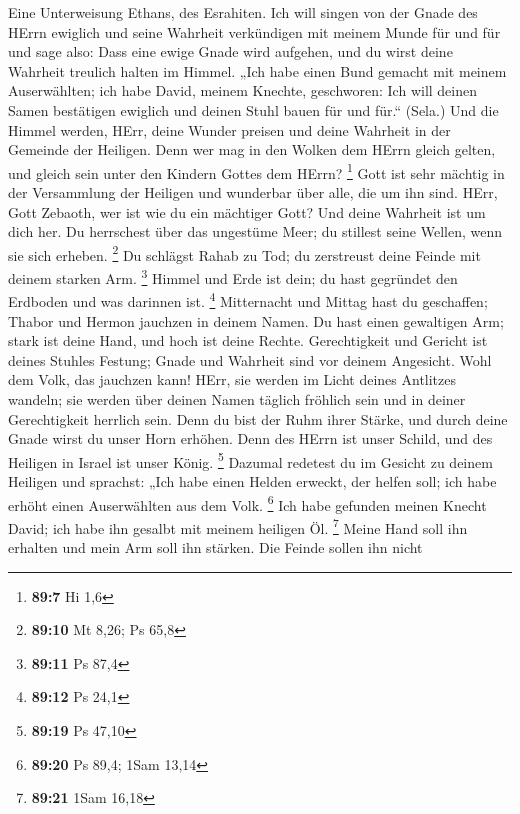  Eine Unterweisung Ethans, des Esrahiten. 
Ich will singen von der Gnade des HErrn ewiglich und seine Wahrheit
verkündigen mit meinem Munde für und für  und sage also:
Dass eine ewige Gnade wird aufgehen, und du wirst deine Wahrheit
treulich halten im Himmel.  „Ich habe einen Bund gemacht
mit meinem Auserwählten; ich habe David, meinem Knechte, geschworen:
 Ich will deinen Samen bestätigen ewiglich und deinen
Stuhl bauen für und für.`` (Sela.)  Und die Himmel werden,
HErr, deine Wunder preisen und deine Wahrheit in der Gemeinde der
Heiligen.  Denn wer mag in den Wolken dem HErrn gleich
gelten, und gleich sein unter den Kindern Gottes dem HErrn? \footnote{\textbf{89:7}
  Hi 1,6}  Gott ist sehr mächtig in der Versammlung der
Heiligen und wunderbar über alle, die um ihn sind.  HErr,
Gott Zebaoth, wer ist wie du ein mächtiger Gott? Und deine Wahrheit ist
um dich her.  Du herrschest über das ungestüme Meer; du
stillest seine Wellen, wenn sie sich erheben. \footnote{\textbf{89:10}
  Mt 8,26; Ps 65,8}  Du schlägst Rahab zu Tod; du
zerstreust deine Feinde mit deinem starken Arm. \footnote{\textbf{89:11}
  Ps 87,4}  Himmel und Erde ist dein; du hast gegründet
den Erdboden und was darinnen ist. \footnote{\textbf{89:12} Ps 24,1}
 Mitternacht und Mittag hast du geschaffen; Thabor und
Hermon jauchzen in deinem Namen.  Du hast einen
gewaltigen Arm; stark ist deine Hand, und hoch ist deine Rechte.
 Gerechtigkeit und Gericht ist deines Stuhles Festung;
Gnade und Wahrheit sind vor deinem Angesicht.  Wohl dem
Volk, das jauchzen kann! HErr, sie werden im Licht deines Antlitzes
wandeln;  sie werden über deinen Namen täglich fröhlich
sein und in deiner Gerechtigkeit herrlich sein.  Denn du
bist der Ruhm ihrer Stärke, und durch deine Gnade wirst du unser Horn
erhöhen.  Denn des HErrn ist unser Schild, und des
Heiligen in Israel ist unser König. \footnote{\textbf{89:19} Ps 47,10}
 Dazumal redetest du im Gesicht zu deinem Heiligen und
sprachst: „Ich habe einen Helden erweckt, der helfen soll; ich habe
erhöht einen Auserwählten aus dem Volk. \footnote{\textbf{89:20} Ps
  89,4; 1Sam 13,14}  Ich habe gefunden meinen Knecht
David; ich habe ihn gesalbt mit meinem heiligen Öl. \footnote{\textbf{89:21}
  1Sam 16,18}  Meine Hand soll ihn erhalten und mein Arm
soll ihn stärken.  Die Feinde sollen ihn nicht
